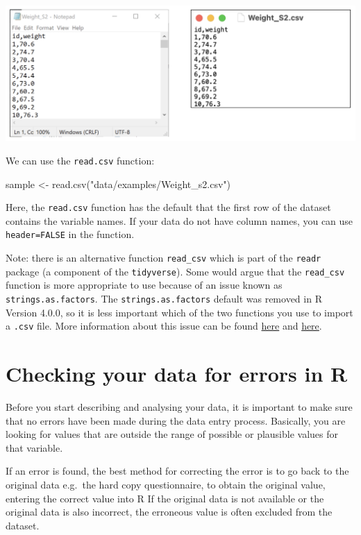 \documentclass[
]{memoir}
\newenvironment{Shaded}{\begin{snugshade}}{\end{snugshade}}
\newcommand{\FunctionTok}[1]{\textcolor[rgb]{0.00,0.00,0.00}{#1}}
\newcommand{\NormalTok}[1]{#1}
\newcommand{\OtherTok}[1]{\textcolor[rgb]{0.56,0.35,0.01}{#1}}
\newcommand{\StringTok}[1]{\textcolor[rgb]{0.31,0.60,0.02}{#1}}
\begin{document}
\includegraphics[width=0.66\linewidth]{img/mod02/import-01}

We can use the \texttt{read.csv} function:

\begin{Shaded}
\begin{Highlighting}[]
\NormalTok{sample }\OtherTok{\textless{}{-}} \FunctionTok{read.csv}\NormalTok{(}\StringTok{"data/examples/Weight\_s2.csv"}\NormalTok{)}
\end{Highlighting}
\end{Shaded}

Here, the \texttt{read.csv} function has the default that the first row of the dataset contains the variable names. If your data do not have column names, you can use \texttt{header=FALSE} in the function.

Note: there is an alternative function \texttt{read\_csv} which is part of the \texttt{readr} package (a component of the \texttt{tidyverse}). Some would argue that the \texttt{read\_csv} function is more appropriate to use because of an issue known as \texttt{strings.as.factors}. The \texttt{strings.as.factors} default was removed in R Version 4.0.0, so it is less important which of the two functions you use to import a \texttt{.csv} file. More information about this issue can be found \href{https://simplystatistics.org/posts/2015-07-24-stringsasfactors-an-unauthorized-biography}{here} and \href{https://developer.r-project.org/Blog/public/2020/02/16/stringsasfactors/}{here}.

\hypertarget{checking-your-data-for-errors-in-r}{%
\section{Checking your data for errors in R}\label{checking-your-data-for-errors-in-r}}

Before you start describing and analysing your data, it is important to make sure that no errors have been made during the data entry process. Basically, you are looking for values that are outside the range of possible or plausible values for that variable.

If an error is found, the best method for correcting the error is to go back to the original data e.g.~the hard copy questionnaire, to obtain the original value, entering the correct value into R If the original data is not available or the original data is also incorrect, the erroneous value is often excluded from the dataset.
\end{document}
